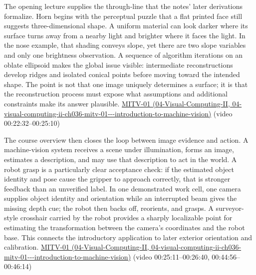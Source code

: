 The opening lecture supplies the through-line that the notes' later derivations formalize. Horn begins with the perceptual puzzle that a flat printed face still suggests three-dimensional shape. A uniform material can look darker where its surface turns away from a nearby light and brighter where it faces the light. In the nose example, that shading conveys slope, yet there are two slope variables and only one brightness observation. A sequence of algorithm iterations on an oblate ellipsoid makes the global issue visible: intermediate reconstructions develop ridges and isolated conical points before moving toward the intended shape. The point is not that one image uniquely determines a surface; it is that the reconstruction process must expose what assumptions and additional constraints make its answer plausible. \href{../04-Visual-Computing-II/main.pdf\#nameddest=04-visual-computing-ii-ch036-mitv-01---introduction-to-machine-vision}{MITV-01 (04-Visual-Computing-II, 04-visual-computing-ii-ch036-mitv-01-\/-\/-introduction-to-machine-vision)} (video 00:22:32--00:25:10)

The course overview then closes the loop between image evidence and action. A machine-vision system receives a scene under illumination, forms an image, estimates a description, and may use that description to act in the world. A robot grasp is a particularly clear acceptance check: if the estimated object identity and pose cause the gripper to approach correctly, that is stronger feedback than an unverified label. In one demonstrated work cell, one camera supplies object identity and orientation while an interrupted beam gives the missing depth cue; the robot then backs off, reorients, and grasps. A surveyor-style crosshair carried by the robot provides a sharply localizable point for estimating the transformation between the camera's coordinates and the robot base. This connects the introductory application to later exterior orientation and calibration. \href{../04-Visual-Computing-II/main.pdf\#nameddest=04-visual-computing-ii-ch036-mitv-01---introduction-to-machine-vision}{MITV-01 (04-Visual-Computing-II, 04-visual-computing-ii-ch036-mitv-01-\/-\/-introduction-to-machine-vision)} (video 00:25:11--00:26:40, 00:44:56--00:46:14)

